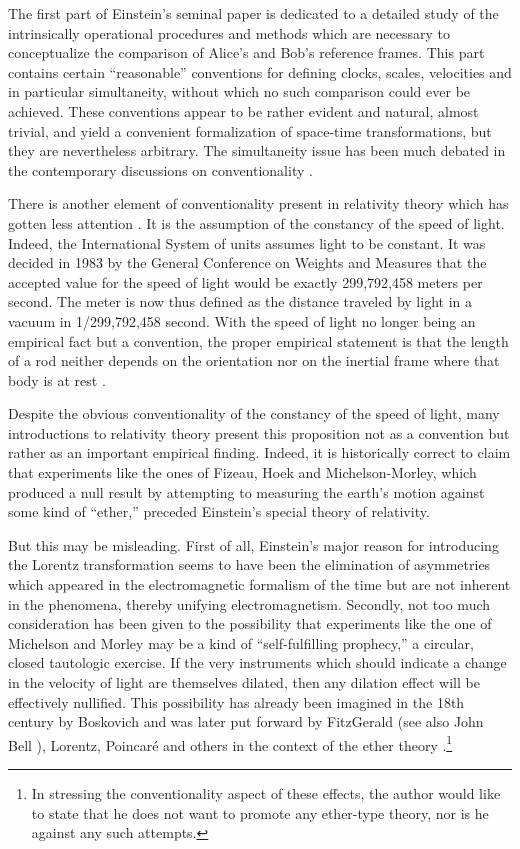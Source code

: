 The first part of Einstein's seminal paper
\cite{ein-05} is dedicated to a detailed study of the
intrinsically operational procedures and methods which are necessary to
conceptualize the comparison of Alice's and Bob's reference frames.
This part  contains certain ``reasonable'' conventions
for defining clocks, scales,
velocities and in particular simultaneity,
without which no such comparison could ever be achieved.
These conventions appear to be rather evident and natural,
almost trivial, and yield a convenient
formalization of space-time transformations, but they are
nevertheless arbitrary.
The simultaneity issue has been much debated in the contemporary
discussions on conventionality  \cite{malamet,redhead-93,stanf-enc-syn}.


There is another element of conventionality present in relativity
theory which has gotten less attention \cite{svozil-relrel}.
It is the assumption of the constancy of the speed of light.
Indeed, the International System of units assumes light to be
constant.
It was
decided in 1983 by the General Conference on Weights and Measures that the
accepted value for the speed of light would be exactly 299,792,458
meters per
second.
The meter is now thus  defined as the distance traveled by
light in a vacuum in 1/299,792,458 second.
With the speed of light no longer being an empirical fact but a
convention, the proper empirical statement is that
the length of a rod neither depends on the orientation nor on the inertial frame
where that body is at rest \cite{peres-84}.


Despite the obvious conventionality of the constancy of the speed of
light, many introductions to relativity theory present this proposition
not as a convention but rather as an important empirical finding.
Indeed, it is historically correct to claim that experiments like
the ones of Fizeau, Hoek and Michelson-Morley, which
produced a null result by attempting to measuring the earth's motion
against some kind of ``ether,'' preceded Einstein's special theory of
relativity.

But this may be misleading.
First of all, Einstein's major reason for introducing the Lorentz
transformation seems to have been the elimination of asymmetries
which appeared in the
electromagnetic formalism of the time but are not inherent in the
phenomena, thereby unifying electromagnetism.
Secondly, not too much consideration has been given to the possibility
that experiments like the one of Michelson and Morley may be
a kind of
``self-fulfilling prophecy,'' a circular, closed tautologic exercise.
If the very instruments
which should indicate a change in the velocity of light are themselves
dilated, then any dilation effect will be effectively nullified.
This possibility has already been imagined in the 18th century
by Boskovich \cite{bos} and was later put forward by
FitzGerald
\cite{FitzGerald2} (see also John Bell \cite{bell-sr1,bell-92}),
Lorentz, Poincar\'e  and others in the
context of the ether theory \cite{miller-1998}.\footnote{
In stressing the conventionality aspect of these effects,
the author would like to state that he does not want to promote
any ether-type theory, nor is he against any such attempts.}

